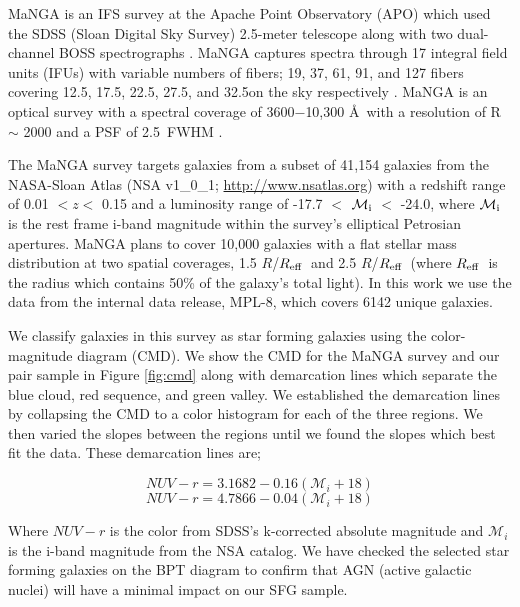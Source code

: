 \documentclass[iop,revtex4,twocolumn,apj,numberedappendix,appendixfloats]{emulateapj}
\newcommand{\reff}{$R_{\rm eff}$}
\begin{document}
MaNGA is an IFS survey at the Apache Point Observatory (APO) which used the SDSS (Sloan Digital Sky Survey) 2.5-meter telescope along with two dual-channel BOSS spectrographs \citep{Drory:2015}. MaNGA captures spectra through 17 integral field units (IFUs) with variable numbers of fibers; 19, 37, 61, 91, and 127 fibers covering 12.5\arcsec, 17.5\arcsec, 22.5\arcsec, 27.5\arcsec, and 32.5\arcsec on the sky respectively \citep{Law:2015}. MaNGA is an optical survey with a spectral coverage of 3600$-$10,300 \AA\ with a resolution of R $\sim$ 2000 and a PSF of 2.5\arcsec\ FWHM \citep{Bundy:2015}. 

The MaNGA survey targets galaxies from a subset of 41,154 galaxies from the NASA-Sloan Atlas (NSA v1\_0\_1; \url{http://www.nsatlas.org}) with a redshift range of 0.01 $< z <$ 0.15 and a luminosity range of -17.7 $<$ $\mathcal{M_{\rm i}}$ $<$ -24.0, where $\mathcal{M_{\rm i}}$ is the rest frame i-band magnitude within the survey's elliptical Petrosian apertures. MaNGA plans to cover 10,000 galaxies with a flat stellar mass distribution at two spatial coverages, 1.5 $R$/\reff\ and 2.5 $R$/\reff\ (where \reff\ is the radius which contains 50\% of the galaxy's total light). In this work we use the data from the internal data release, MPL-8, which covers 6142 unique galaxies. 

We classify galaxies in this survey as star forming galaxies using the color-magnitude diagram (CMD). We show the CMD for the MaNGA survey and our pair sample in Figure \ref{fig:cmd} along with demarcation lines which separate the blue cloud, red sequence, and green valley. We established the demarcation lines by collapsing the CMD to a color histogram for each of the three regions. We then varied the slopes between the regions until we found the slopes which best fit the data. These demarcation lines are;

\begin{equation}\label{eq:blue}
NUV-r = 3.1682 - 0.16 (\mathcal{M}_i+18)
\end{equation}
\begin{equation}\label{eq:red}
NUV-r = 4.7866 - 0.04 (\mathcal{M}_i+18)
\end{equation}

Where $NUV-r$ is the color from SDSS's k-corrected absolute magnitude and $\mathcal{M}_i$ is the i-band magnitude from the NSA catalog. We have checked the selected star forming galaxies on the BPT diagram \citep{Baldwin:1981} to confirm that AGN (active galactic nuclei) will have a minimal impact on our SFG sample.
\end{document}
